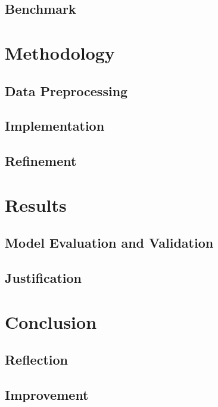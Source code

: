 \documentclass[a4paper,12pt,nottoc]{article}
\begin{document}
\subsection{Benchmark}

\section{Methodology}

\subsection{Data Preprocessing}

\subsection{Implementation}

\subsection{Refinement}

\section{Results}

\subsection{Model Evaluation and Validation}

\subsection{Justification}

\section{Conclusion}

\subsection{Reflection}

\subsection{Improvement}
\end{document}
